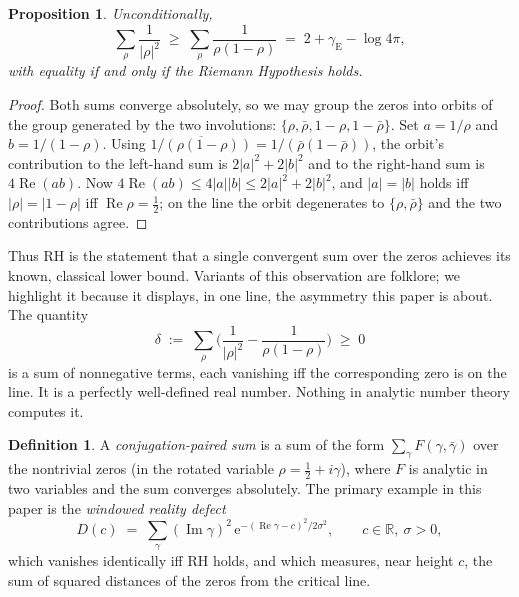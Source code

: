 \documentclass[11pt]{amsart}
\newtheorem{proposition}[theorem]{Proposition}
\theoremstyle{definition}
\newtheorem{definition}[theorem]{Definition}
\theoremstyle{remark}
\newcommand{\RR}{\mathbb{R}}
\newcommand{\eE}{\mathrm{e}}
\DeclareMathOperator{\Rre}{Re}
\DeclareMathOperator{\Iim}{Im}
\begin{document}
\begin{proposition}\label{prop:gateway}
Unconditionally,
\[
\sum_\rho\frac1{|\rho|^{2}}\;\ge\;\sum_\rho\frac1{\rho(1-\rho)}\;=\;2+\gamma_{\mathrm{E}}-\log4\pi,
\]
with equality if and only if the Riemann Hypothesis holds.
\end{proposition}

\begin{proof}
Both sums converge absolutely, so we may group the zeros into orbits of the group generated by the two involutions: $\{\rho,\bar\rho,1-\rho,1-\bar\rho\}$. Set $a=1/\rho$ and $b=1/(1-\rho)$. Using $\overline{1/(\rho(1-\rho))}=1/(\bar\rho(1-\bar\rho))$, the orbit's contribution to the left-hand sum is $2|a|^2+2|b|^2$ and to the right-hand sum is $4\Rre(ab)$. Now $4\Rre(ab)\le4|a||b|\le2|a|^2+2|b|^2$, and $|a|=|b|$ holds iff $|\rho|=|1-\rho|$ iff $\Rre\rho=\tfrac12$; on the line the orbit degenerates to $\{\rho,\bar\rho\}$ and the two contributions agree. \end{proof}

Thus RH is the statement that a single convergent sum over the zeros achieves its known, classical lower bound. Variants of this observation are folklore; we highlight it because it displays, in one line, the asymmetry this paper is about. The quantity
\begin{equation}\label{eq:scalardefect}
\delta \;:=\; \sum_\rho\Big(\frac1{|\rho|^{2}}-\frac1{\rho(1-\rho)}\Big)\;\ge\;0
\end{equation}
is a sum of nonnegative terms, each vanishing iff the corresponding zero is on the line. It is a perfectly well-defined real number. Nothing in analytic number theory computes it.

\begin{definition}\label{def:paired}
A \emph{conjugation-paired sum} is a sum of the form $\sum_\gamma F(\gamma,\bar\gamma)$ over the nontrivial zeros (in the rotated variable $\rho=\tfrac12+i\gamma$), where $F$ is analytic in two variables and the sum converges absolutely. The primary example in this paper is the \emph{windowed reality defect}
\begin{equation}\label{eq:defect}
D(c)\;=\;\sum_\gamma (\Iim\gamma)^2\, \eE^{-(\Rre\gamma-c)^2/2\sigma^2},\qquad c\in\RR,\ \sigma>0,
\end{equation}
which vanishes identically iff RH holds, and which measures, near height $c$, the sum of squared distances of the zeros from the critical line.
\end{definition}
\end{document}
